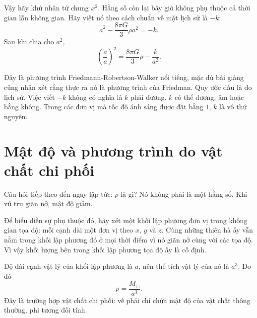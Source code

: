 Vậy hãy khử nhân tử chung \(x^2\). Hằng số còn lại bây giờ không phụ thuộc cả thời gian lẫn không gian. Hãy viết nó theo cách chuẩn về mặt lịch sử là \(-k\):
\begin{equation}
\dot a^2-\frac{8\pi G}{3}\rho a^2=-k.
\end{equation}
Sau khi chia cho \(a^2\),
\begin{equation}
\left(\frac{\dot a}{a}\right)^2=\frac{8\pi G}{3}\rho-\frac{k}{a^2}.
\end{equation}

Đây là phương trình Friedmann-Robertson-Walker nổi tiếng, mặc dù bài giảng cũng nhận xét rằng thực ra nó là phương trình của Friedman. Quy ước dấu là do lịch sử. Việc viết \(-k\) không có nghĩa là \(k\) phải dương. \(k\) có thể dương, âm hoặc bằng không. Trong các đơn vị mà tốc độ ánh sáng được đặt bằng \(1\), \(k\) là vô thứ nguyên.

\section{Mật độ và phương trình do vật chất chi phối}

Câu hỏi tiếp theo đến ngay lập tức: \(\rho\) là gì? Nó không phải là một hằng số. Khi vũ trụ giãn nở, mật độ giảm.

Để biểu diễn sự phụ thuộc đó, hãy xét một khối lập phương đơn vị trong không gian tọa độ: mỗi cạnh dài một đơn vị theo \(x\), \(y\) và \(z\). Cùng những thiên hà ấy vẫn nằm trong khối lập phương đó ở mọi thời điểm vì nó giãn nở cùng với các tọa độ. Vì vậy khối lượng bên trong khối lập phương tọa độ ấy là cố định.


Độ dài cạnh vật lý của khối lập phương là \(a\), nên thể tích vật lý của nó là \(a^3\). Do đó
\begin{equation}
\rho=\frac{M_{\Box}}{a^3}.
\end{equation}
Đây là trường hợp vật chất chi phối: vế phải chỉ chứa mật độ của vật chất thông thường, phi tương đối tính.

\begin{classroomqa}
\end{classroomqa}

